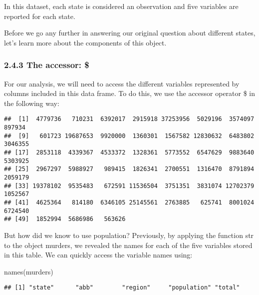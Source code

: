 \documentclass[
]{article}
\newenvironment{Shaded}{\begin{snugshade}}{\end{snugshade}}
\newcommand{\FunctionTok}[1]{\textcolor[rgb]{0.00,0.00,0.00}{#1}}
\newcommand{\NormalTok}[1]{#1}
\newcommand{\SpecialCharTok}[1]{\textcolor[rgb]{0.00,0.00,0.00}{#1}}
\begin{document}
In this dataset, each state is considered an observation and five
variables are reported for each state.

Before we go any further in answering our original question about
different states, let's learn more about the components of this object.

\hypertarget{the-accessor}{%
\subsubsection{2.4.3 The accessor: \$}\label{the-accessor}}

For our analysis, we will need to access the different variables
represented by columns included in this data frame. To do this, we use
the accessor operator \$ in the following way:

\begin{Shaded}
\end{Shaded}

\begin{verbatim}
##  [1]  4779736   710231  6392017  2915918 37253956  5029196  3574097   897934
##  [9]   601723 19687653  9920000  1360301  1567582 12830632  6483802  3046355
## [17]  2853118  4339367  4533372  1328361  5773552  6547629  9883640  5303925
## [25]  2967297  5988927   989415  1826341  2700551  1316470  8791894  2059179
## [33] 19378102  9535483   672591 11536504  3751351  3831074 12702379  1052567
## [41]  4625364   814180  6346105 25145561  2763885   625741  8001024  6724540
## [49]  1852994  5686986   563626
\end{verbatim}

But how did we know to use population? Previously, by applying the
function str to the object murders, we revealed the names for each of
the five variables stored in this table. We can quickly access the
variable names using:

\begin{Shaded}
\begin{Highlighting}[]
\FunctionTok{names}\NormalTok{(murders)}
\end{Highlighting}
\end{Shaded}

\begin{verbatim}
## [1] "state"      "abb"        "region"     "population" "total"
\end{verbatim}
\end{document}

